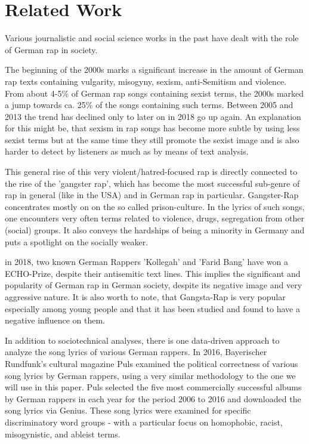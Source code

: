 \section{Related Work}\label{sec:research}

Various journalistic and social science works in the past have dealt with the role of German rap in society.

The beginning of the 2000s marks a significant increase in the amount of German rap texts containing vulgarity, misogyny, sexism, anti-Semitism and violence. From about 4-5\% of German rap songs containing sexist terms, the 2000s marked a jump towards ca. 25\% of the songs containing such terms. Between 2005 and 2013 the trend has declined only to later on in 2018 go up again. An explanation for this might be, that sexism in rap songs has become more subtle by using less sexist terms but at the same time they still promote the sexist image and is also harder to detect by listeners as much as by means of text analysis. \cite{rohwer_2020}

This general rise of this very violent/hatred-focused rap is directly connected to the rise of the 'gangster rap', which has become the most successful sub-genre of rap in general (like in the USA) and in German rap in particular.
Gangster-Rap concentrates mostly on on the so called prison-culture. In the lyrics of such songs, one encounters very often terms related to violence, drugs, segregation from other (social) groups. It also conveys the hardships of being a minority in Germany and puts a spotlight on the socially weaker. \cite{wiegangsta}

in 2018, two known German Rappers 'Kollegah' and 'Farid Bang' have won a ECHO-Prize, despite their antisemitic text lines. \cite{kollegahfarid}
This implies the significant and popularity of German rap in German society, despite its negative image and very aggressive nature. It is also worth to note, that Gangsta-Rap is very popular especially among young people and that it has been studied and found to have a negative influence on them. \cite{jugendeinfluss, bielefeld_studie,salomo_greven_2021}

In addition to sociotechnical analyses, there is one data-driven approach to analyze the song lyrics of various German rappers. In 2016, Bayerischer Rundfunk's cultural magazine Puls \cite{puls_2016} examined the political correctness of various song lyrics by German rappers, using a very similar methodology to the one we will use in this paper. Puls selected the five most commercially successful albums by German rappers in each year for the period 2006 to 2016 and downloaded the song lyrics via Genius. These song lyrics were examined for specific discriminatory word groups - with a particular focus on homophobic, racist, misogynistic, and ableist terms.

